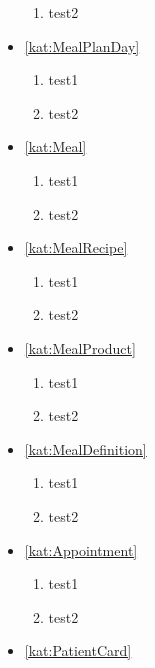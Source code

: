 \begin{itemize}[label={\textbf{Ograniczenia dla}}, wide, labelwidth=!, labelindent=0pt]
\begin{enumerate}[label={\textbf{OGR/\protect\threedigits{\arabic{enumi}}}}, wide, labelwidth=!, resume]
        \item test2
    \end{enumerate}
    \item\ref{kat:MealPlanDay}
    \begin{enumerate}[label={\textbf{OGR/\protect\threedigits{\arabic{enumi}}}}, wide, labelwidth=!, resume]
        \item test1
        \item test2
    \end{enumerate}
    \item\ref{kat:Meal}
    \begin{enumerate}[label={\textbf{OGR/\protect\threedigits{\arabic{enumi}}}}, wide, labelwidth=!, resume]
        \item test1
        \item test2
    \end{enumerate}
    \item\ref{kat:MealRecipe}
    \begin{enumerate}[label={\textbf{OGR/\protect\threedigits{\arabic{enumi}}}}, wide, labelwidth=!, resume]
        \item test1
        \item test2
    \end{enumerate}
    \item\ref{kat:MealProduct}
    \begin{enumerate}[label={\textbf{OGR/\protect\threedigits{\arabic{enumi}}}}, wide, labelwidth=!, resume]
        \item test1
        \item test2
    \end{enumerate}
    \item\ref{kat:MealDefinition}
    \begin{enumerate}[label={\textbf{OGR/\protect\threedigits{\arabic{enumi}}}}, wide, labelwidth=!, resume]
        \item test1
        \item test2
    \end{enumerate}
    \item\ref{kat:Appointment}
    \begin{enumerate}[label={\textbf{OGR/\protect\threedigits{\arabic{enumi}}}}, wide, labelwidth=!, resume]
        \item test1
        \item test2
    \end{enumerate}
    \item\ref{kat:PatientCard}
    \begin{enumerate}[label={\textbf{OGR/\protect\threedigits{\arabic{enumi}}}}, wide, labelwidth=!, resume]

\end{enumerate}
\end{itemize}
